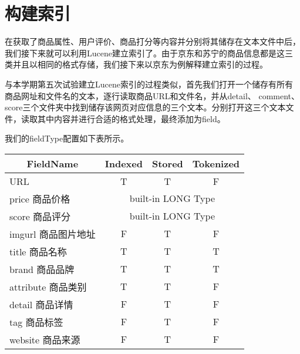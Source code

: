 \chapter{构建索引}
在获取了商品属性、用户评价、商品打分等内容并分别将其储存在文本文件中后，我们接下来就可以利用Lucene建立索引了。由于京东和苏宁的商品信息都是这三类并且以相同的格式存储，我们接下来以京东为例解释建立索引的过程。

与本学期第五次试验建立Lucene索引的过程类似，首先我们打开一个储存有所有商品网址和文件名的文本，逐行读取商品URL和文件名，并从detail、 comment、score三个文件夹中找到储存该网页对应信息的三个文本。分别打开这三个文本文件，读取其中内容并进行合适的格式处理，最终添加为field。

我们的fieldType配置如下表所示。
\begin{table}[h]
\begin{tabular}{lccc}
\hline
\multicolumn{1}{c}{\textbf{FieldName}} & \textbf{Indexed} & \textbf{Stored} & \textbf{Tokenized} \\ \hline
URL                                    & T                & T               & F                  \\
price 商品价格                             & \multicolumn{3}{c}{built-in LONG Type}                  \\
score 商品评分                             & \multicolumn{3}{c}{built-in LONG Type}                  \\
imgurl 商品图片地址                          & F                & T               & F                  \\
title 商品名称                             & T                & T               & T                  \\
brand 商品品牌                             & T                & T               & T                  \\
attribute 商品类别                         & T                & T               & F                  \\
detail 商品详情                            & F                & T               & F                  \\
tag 商品标签                               & F                & T               & F                  \\
website 商品来源                           & F                & T               & F                  \\ \hline
\end{tabular}
\end{table}



